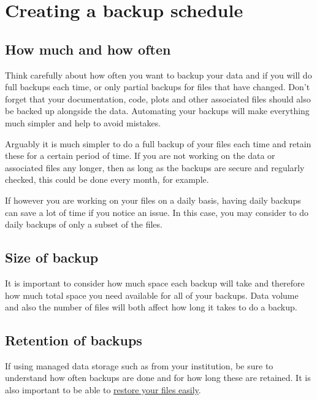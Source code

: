 \documentclass[12pt,a4paper,oneside]{report}
\begin{document}
\hypertarget{creating-a-backup-schedule}{%
\section{Creating a backup schedule}\label{creating-a-backup-schedule}}

\hypertarget{how-much-and-how-often}{%
\subsection{How much and how often}\label{how-much-and-how-often}}

Think carefully about how often you want to backup your data and if you
will do full backups each time, or only partial backups for files that
have changed. Don't forget that your documentation, code, plots and
other associated files should also be backed up alongside the data.
Automating your backups will make everything much simpler and help to
avoid mistakes.

Arguably it is much simpler to do a full backup of your files each time
and retain these for a certain period of time. If you are not working on
the data or associated files any longer, then as long as the backups are
secure and regularly checked, this could be done every month, for
example.

If however you are working on your files on a daily basis, having daily
backups can save a lot of time if you notice an issue. In this case, you
may consider to do daily backups of only a subset of the files.

\hypertarget{size-of-backup}{%
\subsection{Size of backup}\label{size-of-backup}}

It is important to consider how much space each backup will take and
therefore how much total space you need available for all of your
backups. Data volume and also the number of files will both affect how
long it takes to do a backup.

\hypertarget{retention-of-backups}{%
\subsection{Retention of backups}\label{retention-of-backups}}

If using managed data storage such as from your institution, be sure to
understand how often backups are done and for how long these are
retained. It is also important to be able to
\protect\hyperlink{file-restoration}{restore your files easily}.
\end{document}
